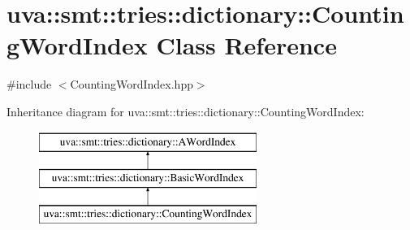 \hypertarget{classuva_1_1smt_1_1tries_1_1dictionary_1_1_counting_word_index}{}\section{uva\+:\+:smt\+:\+:tries\+:\+:dictionary\+:\+:Counting\+Word\+Index Class Reference}
\label{classuva_1_1smt_1_1tries_1_1dictionary_1_1_counting_word_index}


{\ttfamily \#include $<$Counting\+Word\+Index.\+hpp$>$}

Inheritance diagram for uva\+:\+:smt\+:\+:tries\+:\+:dictionary\+:\+:Counting\+Word\+Index\+:\begin{figure}[H]
\begin{center}
\leavevmode
\includegraphics[height=3.000000cm]{classuva_1_1smt_1_1tries_1_1dictionary_1_1_counting_word_index}
\end{center}
\end{figure}
